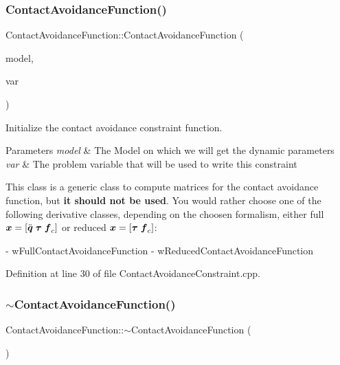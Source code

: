 \subsubsection{\texorpdfstring{Contact\+Avoidance\+Function()}{ContactAvoidanceFunction()}}
{\footnotesize\ttfamily Contact\+Avoidance\+Function\+::\+Contact\+Avoidance\+Function (\begin{DoxyParamCaption}\item[{const Model \&}]{model,  }\item[{\hyperlink{classocra_1_1Variable}{Variable} \&}]{var }\end{DoxyParamCaption})}

Initialize the contact avoidance constraint function.


\begin{DoxyParams}{Parameters}
{\em model} & The Model on which we will get the dynamic parameters \\
\hline
{\em var} & The problem variable that will be used to write this constraint\\
\hline
\end{DoxyParams}
This class is a generic class to compute matrices for the contact avoidance function, but {\bfseries it should not be used}. You would rather choose one of the following derivative classes, depending on the choosen formalism, either full $ \mbox{\boldmath${x}$} = [ \ddot{\mbox{\boldmath${q}$}} \; \mbox{\boldmath${\tau}$} \; \mbox{\boldmath${f}$}_c ] $ or reduced $ \mbox{\boldmath${x}$} = [ \mbox{\boldmath${\tau}$} \; \mbox{\boldmath${f}$}_c ] $\+: \begin{DoxyVerb} - wFullContactAvoidanceFunction
 - wReducedContactAvoidanceFunction\end{DoxyVerb}
 

Definition at line 30 of file Contact\+Avoidance\+Constraint.\+cpp.

\hypertarget{classocra_1_1ContactAvoidanceFunction_a5309c1fd586ed0292ee5eebfafacef9b}{}\label{classocra_1_1ContactAvoidanceFunction_a5309c1fd586ed0292ee5eebfafacef9b} 
\subsubsection{\texorpdfstring{$\sim$\+Contact\+Avoidance\+Function()}{~ContactAvoidanceFunction()}}
{\footnotesize\ttfamily Contact\+Avoidance\+Function\+::$\sim$\+Contact\+Avoidance\+Function (\begin{DoxyParamCaption}{ }\end{DoxyParamCaption})}

